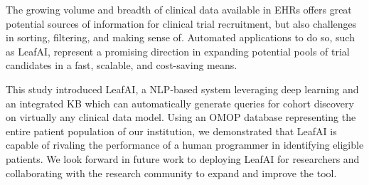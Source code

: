 \documentclass[../main.tex]{subfiles}
\begin{document}
The growing volume and breadth of clinical data available in EHRs offers great potential sources of information for clinical trial recruitment, but also challenges in sorting, filtering, and making sense of. Automated applications to do so, such as LeafAI, represent a promising direction in expanding potential pools of trial candidates in a fast, scalable, and cost-saving means.

This study introduced LeafAI, a NLP-based system leveraging deep learning and an integrated KB which can automatically generate queries for cohort discovery on virtually any clinical data model. Using an OMOP database representing the entire patient population of our institution, we demonstrated that LeafAI is capable of rivaling the performance of a human programmer in identifying eligible patients. We look forward in future work to deploying LeafAI for researchers and collaborating with the research community to expand and improve the tool.
\end{document}
